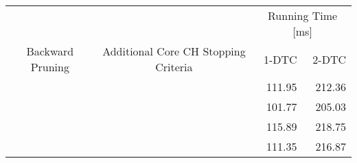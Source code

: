 \begin{tabular}{ccrr}
	\toprule
	                 &                                      & \multicolumn{2}{c}{Running Time [\si{\milli\second}]}         \\
	Backward Pruning & Additional Core CH Stopping Criteria & 1-DTC                                                 & 2-DTC \\
	\midrule
	\xmark           & \xmark                               & 111.95                                                     & 212.36     \\
	\cmark           & \xmark                               & 101.77                                                     & 205.03     \\
	\xmark           & \cmark                               & 115.89                                                     & 218.75     \\
	\cmark           & \cmark                               & 111.35                                                     & 216.87     \\
	\bottomrule
\end{tabular}